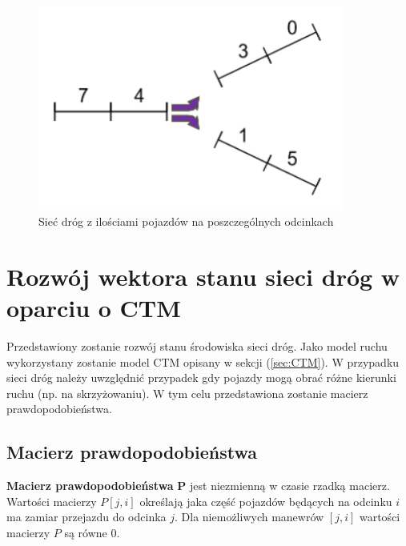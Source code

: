 \documentclass[12pt]{book}
\theoremstyle{plain}
\newcommand{\myref}[1]{(\ref{#1})}
\begin{document}
\begin{figure}[H]
	\centering
	\includegraphics[width=10cm]{images/env_11_743015}
	\caption{Sieć dróg z ilościami pojazdów na poszczególnych odcinkach}
	\label{fig:3_single_road}
\end{figure}

\section{Rozwój wektora stanu sieci dróg w oparciu o CTM}
Przedstawiony zostanie rozwój stanu środowiska sieci dróg. Jako model ruchu wykorzystany zostanie model CTM opisany w sekcji \myref{sec:CTM}. W przypadku sieci dróg należy uwzględnić przypadek  gdy pojazdy mogą obrać różne kierunki ruchu (np. na skrzyżowaniu). W tym celu przedstawiona zostanie macierz prawdopodobieństwa. 
\subsection{Macierz prawdopodobieństwa} \label{sec:macierz_prawd}
\textbf{Macierz prawdopodobieństwa} \textbf{P} jest niezmienną w czasie rzadką macierz. Wartości macierzy $P[j,i]$ określają jaka część pojazdów będących na odcinku $i$ ma zamiar przejazdu do odcinka $j$. Dla niemożliwych manewrów $[j,i]$ wartości macierzy $P$ są równe 0.
\end{document}
